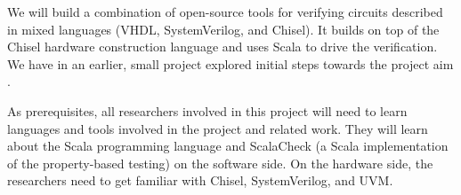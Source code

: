 \documentclass[fleqn,12pt]{article}
\begin{document}
We will build a combination of open-source tools for verifying
circuits described in mixed languages (VHDL, SystemVerilog, and Chisel).
It builds on top of the Chisel hardware construction language and uses Scala to drive the verification. 
We have in an earlier, small project explored initial steps towards
the project aim \cite{verify:chisel:2020}.






As prerequisites, all researchers involved in this project will need to learn
languages and tools involved in the project and related work.
They will learn about the Scala programming language and ScalaCheck
(a Scala implementation of the property-based testing) on the software side.
On the hardware side,
the researchers need to get familiar with Chisel, SystemVerilog, and
UVM.
\end{document}
